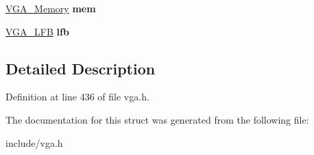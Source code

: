 \begin{DoxyCompactItemize}
\item 
\hypertarget{structVGA__Type_ade860ae7b9935ad2fd4613758b998c1b}{\hyperlink{structVGA__Memory}{V\-G\-A\-\_\-\-Memory} {\bfseries mem}}\label{structVGA__Type_ade860ae7b9935ad2fd4613758b998c1b}

\item 
\hypertarget{structVGA__Type_ab46a6c5770cc6e5a528e6456e998af78}{\hyperlink{structVGA__LFB}{V\-G\-A\-\_\-\-L\-F\-B} {\bfseries lfb}}\label{structVGA__Type_ab46a6c5770cc6e5a528e6456e998af78}

\end{DoxyCompactItemize}


\subsection{Detailed Description}


Definition at line 436 of file vga.\-h.



The documentation for this struct was generated from the following file\-:\begin{DoxyCompactItemize}
\item 
include/vga.\-h\end{DoxyCompactItemize}
